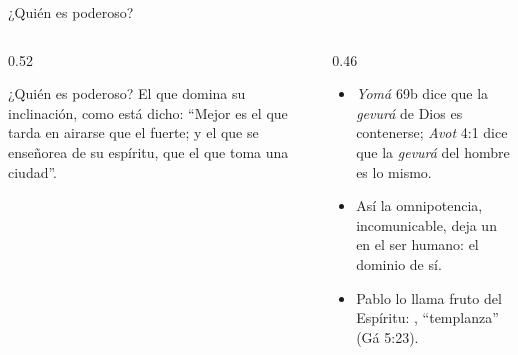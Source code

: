 \begin{frame}{¿Quién es poderoso?}
\begin{columns}[c,onlytextwidth]
\begin{column}{0.52\textwidth}
\begin{cita}[colback=dorado!10!papiro,colframe=dorado!80!azul]¿Quién es poderoso? El que domina su inclinación, como está dicho: ``Mejor es el que tarda en airarse que el fuerte; y el que se enseñorea de su espíritu, que el que toma una ciudad''.\end{cita}
\begin{center}\scriptsize{}\end{center}
\end{column}
\begin{column}{0.46\textwidth}\small
\begin{itemize}
\item \emph{Yomá} 69b dice que la \emph{gevurá} de Dios es contenerse; \emph{Avot} 4:1 dice que la \emph{gevurá} del hombre es lo mismo.
\item Así la omnipotencia, incomunicable, deja un  en el ser humano: el dominio de sí.
\item Pablo lo llama fruto del Espíritu: , ``templanza'' (Gá 5:23).
\end{itemize}
\end{column}
\end{columns}
\end{frame}


